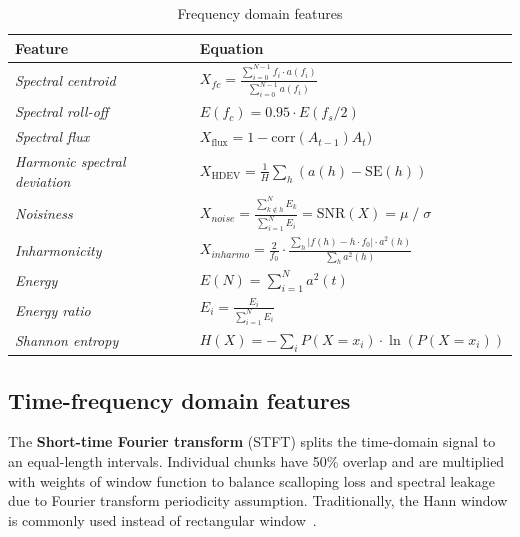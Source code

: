 \begin{table}[ht]
\renewcommand{\arraystretch}{2}
\centering
\begin{tabular}{|l|l|}
\hline
\textbf{Feature}           & \textbf{Equation}                                                                                                  \\ \hline
\textit{Spectral centroid} & $ X_{fc} = \frac{\sum_{i = 0}^{N - 1}{f_i \cdot a(f_i)}}{\sum_{i = 0}^{N - 1}{a(f_i)}}$                   \\ \hline 
\textit{Spectral roll-off} & $ E(f_c) = 0.95 \cdot E(f_s / 2) $                                                   \\ \hline
\textit{Spectral flux}     & $X_{\mathrm{flux}} = 1 - \mathrm{corr}(A_{t-1}) A_t)$ \\ \hline 
\textit{Harmonic spectral deviation} & $ X_{\mathrm{HDEV}} = \frac{1}{H}\sum_h(a(h) - \mathrm{SE}(h))$                                          \\ \hline
\textit{Noisiness}                   & $X_{noise} = \frac{\sum_{k \notin h}^{N}E_k}{\sum_{i = 1}^{N}E_i} = \mathrm{SNR}(X) = \mu \;/\; \sigma $                             \\ \hline
\textit{Inharmonicity}               & $X_{inharmo} = \frac{2}{f_0} \cdot \frac{\sum_h | f(h) - h \cdot f_0| \cdot a^2(h)}{\sum_h a^2(h)}$ \\ \hline
\textit{Energy}            & $ E(N) = \sum_{i = 1}^{N} a^2(t) $                                                                    \\ \hline \textit{Energy ratio}                & $E_i = \frac{E_i}{\sum_{i = 1}^{N}E_i} $                                                        \\ \hline
\textit{Shannon entropy}      & $H(X) = - \sum_{i} P(X = x_i) \cdot \ln(P(X = x_i)) $                                                  \\ \hline
\end{tabular}
\caption{Frequency domain features}
\label{tab:fd-features}
\end{table}

\subsection{Time-frequency domain features}
The \textbf{Short-time Fourier transform} (STFT) splits the time-domain signal to an equal-length intervals. Individual chunks have 50\% overlap and are multiplied with weights of window function to balance scalloping loss and spectral leakage due to Fourier transform periodicity assumption. Traditionally, the Hann window is commonly used instead of rectangular window~\cite{ziaran_technicka_2013,noauthor_iso_2016_2}.

